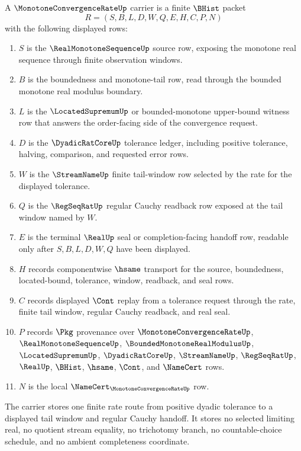 \begin{definition}
\label{def:monotone-convergence-rate-carrier}
A $\MonotoneConvergenceRateUp$ carrier is a finite $\BHist$ packet
$$
R=(S,B,L,D,W,Q,E,H,C,P,N)
$$
with the following displayed rows:
\begin{enumerate}
\item $S$ is the $\RealMonotoneSequenceUp$ source row, exposing the monotone real sequence through finite observation windows.
\item $B$ is the boundedness and monotone-tail row, read through the bounded monotone real modulus boundary.
\item $L$ is the $\LocatedSupremumUp$ or bounded-monotone upper-bound witness row that answers the order-facing side of the convergence request.
\item $D$ is the $\DyadicRatCoreUp$ tolerance ledger, including positive tolerance, halving, comparison, and requested error rows.
\item $W$ is the $\StreamNameUp$ finite tail-window row selected by the rate for the displayed tolerance.
\item $Q$ is the $\RegSeqRatUp$ regular Cauchy readback row exposed at the tail window named by $W$.
\item $E$ is the terminal $\RealUp$ seal or completion-facing handoff row, readable only after $S,B,L,D,W,Q$ have been displayed.
\item $H$ records componentwise $\hsame$ transport for the source, boundedness, located-bound, tolerance, window, readback, and seal rows.
\item $C$ records displayed $\Cont$ replay from a tolerance request through the rate, finite tail window, regular Cauchy readback, and real seal.
\item $P$ records $\Pkg$ provenance over $\MonotoneConvergenceRateUp$, $\RealMonotoneSequenceUp$, $\BoundedMonotoneRealModulusUp$, $\LocatedSupremumUp$, $\DyadicRatCoreUp$, $\StreamNameUp$, $\RegSeqRatUp$, $\RealUp$, $\BHist$, $\hsame$, $\Cont$, and $\NameCert$ rows.
\item $N$ is the local $\NameCert_{\MonotoneConvergenceRateUp}$ row.
\end{enumerate}
The carrier stores one finite rate route from positive dyadic tolerance to a displayed tail window and regular Cauchy handoff. It stores no selected limiting real, no quotient stream equality, no trichotomy branch, no countable-choice schedule, and no ambient completeness coordinate.
\end{definition}

